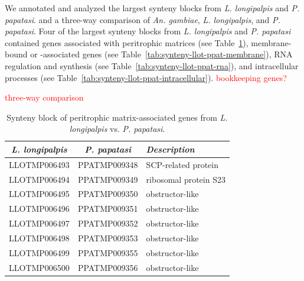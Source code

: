 We annotated and analyzed the largest synteny blocks from \emph{L. longipalpis} and \emph{P. papatasi}. and a three-way comparison of \emph{An. gambiae}, \emph{L. longipalpis}, and \emph{P. papatasi}.  Four of the largest synteny blocks from \emph{L. longipalpis} and \emph{P. papatasi} contained genes associated with peritrophic matrices (see Table~\ref{tab:synteny-llot-ppat-peritrophic}), membrane-bound or -associated genes (see Table~\ref{tab:synteny-llot-ppat-membrane}), RNA regulation and synthesis (see Table~\ref{tab:synteny-llot-ppat-rna}), and intracellular processes (see Table~\ref{tab:synteny-llot-ppat-intracellular}). \textcolor{red}{bookkeeping genes?}

\textcolor{red}{three-way comparison}

\begin{table}[H]
  \centering
  \begin{tabular}{c c l} \hline
    \emph{L. longipalpis} & \emph{P. papatasi} & \emph{Description} \\ \hline
    LLOTMP006493 & PPATMP009348 & SCP-related protein \\
    LLOTMP006494 & PPATMP009349 & ribosomal protein S23 \\
    LLOTMP006495 & PPATMP009350 & obstructor-like \\
    LLOTMP006496 & PPATMP009351 & obstructor-like \\
    LLOTMP006497 & PPATMP009352 & obstructor-like \\
    LLOTMP006498 & PPATMP009353 & obstructor-like \\
    LLOTMP006499 & PPATMP009355 & obstructor-like \\
    LLOTMP006500 & PPATMP009356 & obstructor-like
  \end{tabular}
  \caption{Synteny block of peritrophic matrix-associated genes from \emph{L. longipalpis} vs. \emph{P. papatasi}.}
  \label{tab:synteny-llot-ppat-peritrophic}
\end{table}

